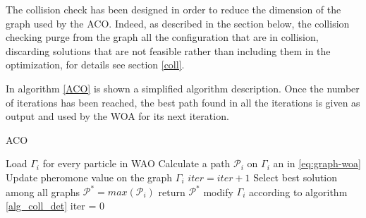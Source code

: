\documentclass[twocolumn]{svjour3}
\begin{document}
The collision check has been designed in order to reduce the dimension of the graph used by the ACO. Indeed, as described in the section below, the collision checking purge from the graph all the configuration that are in collision, discarding solutions that are not feasible rather than including them in the optimization, for details see section \ref{coll}.

In algorithm \ref{ACO} is shown a simplified algorithm description.
Once the number of iterations has been reach\-ed, the best path found in all the iterations is given as output and used by the WOA for its next iteration.

\algrenewcommand\algorithmicindent{3.0em}%
\begin{algorithm*}[ht]
	\footnotesize
	\caption{ACO}
	\label{ACO}
	\begin{algorithmic}[1]
		\State Load $\Gamma_i$ for every particle in WAO
		\State Calculate a path $\mathcal{P}_{i}$ on $\Gamma_i$ an in \eqref{eq:graph-woa}
		\hspace{15em}
		\State Update pheromone value on the graph $\Gamma_i$ 
		\State $iter=iter+1$
		\EndWhile
		\State Select best solution among all graphs $\mathcal{P}^* = max(\mathcal{P}_{i})$
		    \State return $\mathcal{P}^*$
		\Else
		    \State modify $\Gamma_i$ according to algorithm \ref{alg_coll_det}
		    \State iter = 0
        \EndIf
		\EndWhile
		\EndFunction~
	\end{algorithmic}
\end{algorithm*}
\end{document}
